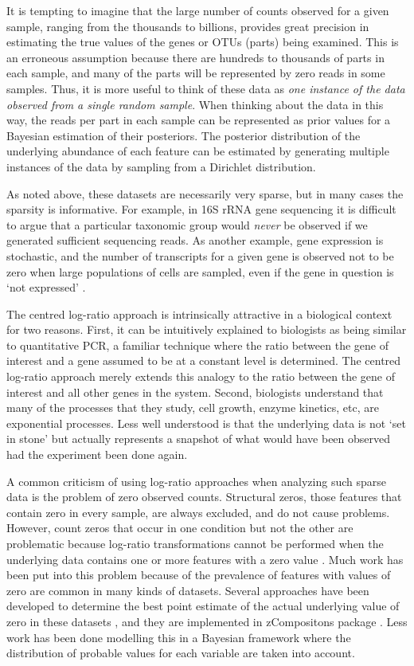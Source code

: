 \documentclass[article]{ajs}\usepackage[]{graphicx}\usepackage[]{color}
\begin{document}
It is tempting to imagine that the large number of counts observed for a given sample, ranging from the thousands to billions, provides great precision in estimating the true values of the genes or OTUs (parts) being examined. This is an erroneous assumption because there are hundreds to thousands of parts in each sample, and many of the parts will be represented by zero reads in some samples. Thus, it is more useful to think of these data as \emph{one instance of the data observed from a single random sample}. When thinking about the data in this way, the reads per part in each sample can be represented as prior values for a Bayesian estimation of their posteriors. The  posterior distribution of the underlying abundance of each feature can be estimated by generating multiple instances of the data by sampling from a Dirichlet distribution. 

As noted above, these datasets are necessarily very sparse, but in many cases the sparsity is informative. For example, in 16S rRNA gene sequencing it is difficult to argue that a particular taxonomic group would \emph{never} be observed if we generated sufficient sequencing reads. As another example, gene expression is stochastic, and the number of transcripts for a given gene is observed not to be zero when large populations of cells are sampled, even if the gene in question is `not expressed' \citep{Munsky:2012aa}. 

The centred log-ratio approach is intrinsically attractive in a biological context for two reasons. First, it can be intuitively explained to biologists as being similar to quantitative PCR, a familiar technique where the ratio between the gene of interest and a gene assumed to be at a constant level is determined. The centred log-ratio approach merely extends this analogy to the ratio between the gene of interest and all other genes in the system. Second, biologists understand that many of the processes that they study, cell growth, enzyme kinetics, etc, are exponential processes. Less well understood is that the underlying data is not `set in stone' but actually represents a snapshot of what would have been observed had the experiment been done again.  

A common criticism of using log-ratio approaches when analyzing such sparse data is the problem of zero observed counts. Structural zeros, those features that contain zero in every sample, are always excluded, and do not cause problems. However, count zeros that occur in one condition but not the other are problematic because log-ratio transformations cannot be performed when the underlying data contains one or more features with a zero value \citep{Aitchison:1986}. Much work has been put into this problem because of the prevalence of features with values of zero are common in many kinds of datasets. Several approaches have been developed to determine the best point estimate of the actual underlying value of zero in these datasets \citep{pawlowsky2015modeling}, and they are implemented in zCompositons  package \citep{PalareaAlbaladejo201585}. Less work has been done modelling this in a Bayesian framework where the distribution of probable values for each variable are taken into account. 
\end{document}
